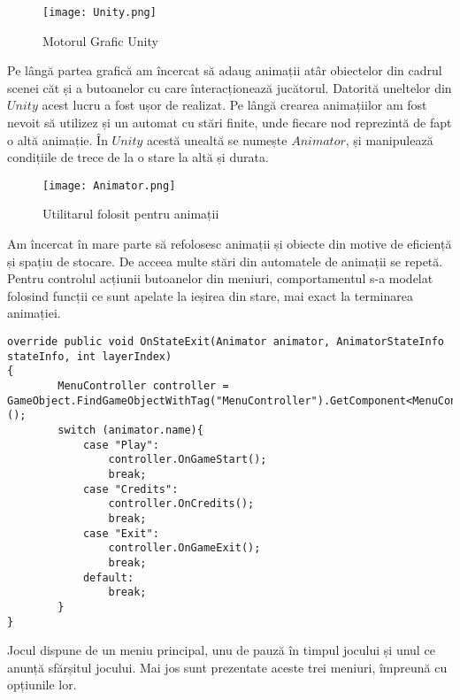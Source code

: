 \vspace{10mm}
\begin{figure}[H]
\centering
\texttt{[image: Unity.png]} \par
\caption{Motorul Grafic Unity}
\end{figure}

Pe lângă partea grafică am încercat să adaug animații  atâr obiectelor din cadrul scenei căt și a butoanelor cu care înteracționează jucătorul. Datorită uneltelor din $Unity$ acest lucru a fost ușor de realizat. Pe lângă crearea animațiilor am fost nevoit să utilizez și un automat cu stări finite, unde fiecare nod reprezintă de fapt o altă animație. În $Unity$ acestă unealtă se numește $Animator$, și manipulează condițiile de trece de la o stare la altă și durata.\par

\vspace{10mm}
\begin{figure}[H]
\centering
\texttt{[image: Animator.png]} \par
\caption{Utilitarul folosit pentru animații}
\end{figure}

Am încercat în mare parte să refolosesc animații și obiecte din motive de eficiență și spațiu de stocare. De acceea multe stări din automatele de animații se repetă. Pentru controlul acțiunii butoanelor din meniuri, comportamentul s-a modelat folosind funcții ce sunt apelate la ieșirea din stare, mai exact la terminarea animației.\par

\begin{lstlisting}[caption=Exemplu de folosire a evenimentului $OnStateExit$]
override public void OnStateExit(Animator animator, AnimatorStateInfo stateInfo, int layerIndex)
{
        MenuController controller = GameObject.FindGameObjectWithTag("MenuController").GetComponent<MenuController>();
        switch (animator.name){
            case "Play":
                controller.OnGameStart();
                break;
            case "Credits":
                controller.OnCredits();
                break;
            case "Exit":
                controller.OnGameExit();
                break;
            default:
                break;
        }
}
\end{lstlisting}

Jocul dispune de un meniu principal, unu de pauză în timpul jocului și unul ce anunță sfărșitul jocului. Mai jos sunt prezentate aceste trei meniuri, împreună cu opțiunile lor.\par

